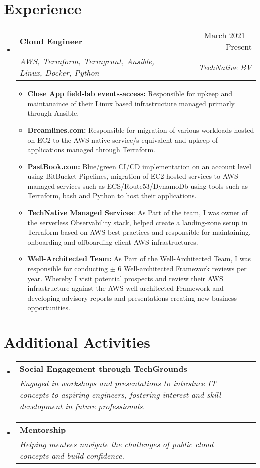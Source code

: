 \documentclass[letterpaper,11pt]{article}
\makeatletter
\newcommand{\resumeItem}[1]{
  \item\small{
    {#1 \vspace{-2pt}}
  }
}
\newcommand{\resumeSubheading}[4]{
  \vspace{-2pt}\item
    \begin{tabular*}{0.97\textwidth}[t]{l@{\extracolsep{\fill}}r}
      \textbf{#1} & #2 \\
      \textit{\small#3} & \textit{\small #4} \\
    \end{tabular*}\vspace{-7pt}
}
\newcommand{\resumeSubSubheading}[2]{
    \item
    \begin{tabular*}{0.97\textwidth}{l@{\extracolsep{\fill}}r}
      \textit{\small#1} & \textit{\small #2} \\
    \end{tabular*}\vspace{-7pt}
}
\newcommand{\resumeSubHeadingListStart}{\begin{itemize}[leftmargin=0.15in, label={}]}
\newcommand{\resumeSubHeadingListEnd}{\end{itemize}}
\newcommand{\resumeItemListStart}{\begin{itemize}}
\newcommand{\resumeItemListEnd}{\end{itemize}\vspace{-5pt}}
\makeatother
\begin{document}

\vspace{0.5cm}
\section{Experience}
  \resumeSubHeadingListStart
    \resumeSubheading
      {Cloud Engineer}{March 2021 -- Present}
      {AWS, Terraform, Terragrunt, Ansible, Linux, Docker, Python}{TechNative BV}
      \resumeItemListStart
        \resumeItem{\textbf{Close App field-lab events-access:} Responsible for upkeep and maintanaince of their Linux based infrastructure managed primarly through Ansible.}{}
        \resumeItem{\textbf{Dreamlines.com:} Responsible for migration of various workloads hosted on EC2 to the AWS native service/s equivalent and upkeep of applications managed through Terraform.}
        \resumeItem{\textbf{PastBook.com:} Blue/green CI/CD implementation on an account level using BitBucket Pipelines, migration of EC2 hosted services to AWS managed services such as ECS/Route53/DynamoDb using tools such as Terraform, bash and Python to host their applications.}
        \resumeItem{\textbf{TechNative Managed Services}: As Part of the team, I was owner of the serverless Observability stack, helped create a landing-zone setup in Terraform based on AWS best practices and responsible for maintaining, onboarding and offboarding client AWS infrastructures.}
        \resumeItem{\textbf{Well-Architected Team:} As Part of the Well-Architected Team, I was responsible for conducting $\pm$ 6 Well-architected Framework reviews per year. Whereby I visit potential prospects and review their AWS infrastructure against the AWS well-architected Framework and developing advisory reports and presentations creating new business opportunities.}
      \resumeItemListEnd
  \resumeSubHeadingListEnd

\vspace{0.5cm}
\section{Additional Activities}
  \resumeSubHeadingListStart
    \resumeSubheading
      {Social Engagement through TechGrounds}{}
      {Engaged in workshops and presentations to introduce IT concepts to aspiring engineers, fostering interest and skill development in future professionals.}{}
    \resumeSubheading
      {Mentorship}{}
      {Helping mentees navigate the challenges of public cloud concepts and build confidence.}{}
  \resumeSubHeadingListEnd
\end{document}
